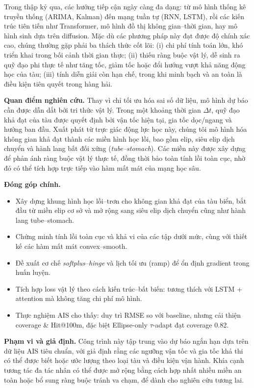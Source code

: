 \documentclass{IEEEtran}
\begin{document}
Trong thập kỷ qua, các hướng tiếp cận ngày càng đa dạng: từ mô hình thống kê truyền thống (ARIMA, Kalman) đến mạng tuần tự (RNN, LSTM), rồi các kiến trúc tiên tiến như Transformer, mô hình đồ thị không gian--thời gian, hay mô hình sinh dựa trên diffusion. 
Mặc dù các phương pháp này đạt được độ chính xác cao, chúng thường gặp phải ba thách thức cốt lõi: 
(i) chi phí tính toán lớn, khó triển khai trong bối cảnh thời gian thực; 
(ii) thiếu ràng buộc vật lý, dễ sinh ra quỹ đạo phi thực tế như tăng tốc, giảm tốc hoặc đổi hướng vượt khả năng động học của tàu; 
(iii) tính diễn giải còn hạn chế, trong khi minh bạch và an toàn là điều kiện tiên quyết trong hàng hải.

\textbf{Quan điểm nghiên cứu.} 
Thay vì chỉ tối ưu hóa sai số dữ liệu, mô hình dự báo cần được dẫn dắt bởi tri thức vật lý. 
Trong một khoảng thời gian $\Delta t$, quỹ đạo khả đạt của tàu được quyết định bởi vận tốc hiện tại, gia tốc dọc/ngang và hướng ban đầu. 
Xuất phát từ trực giác động lực học này, chúng tôi mô hình hóa không gian khả đạt thành các miền hình học lồi, bao gồm elip, siêu elip dịch chuyển và hành lang bất đối xứng (\textit{tube--stomach}). 
Các miền này được xây dựng để phản ánh ràng buộc vật lý thực tế, đồng thời bảo toàn tính lồi toàn cục, nhờ đó có thể tích hợp trực tiếp vào hàm mất mát của mạng học sâu.

\textbf{Đóng góp chính.}
\begin{itemize}
  \item Xây dựng khung hình học lồi--trơn cho không gian khả đạt của tàu biển, 
  bắt đầu từ miền elip cơ sở và mở rộng sang siêu elip dịch chuyển cũng như hành lang tube--stomach.
  \item Chứng minh tính lồi toàn cục và khả vi của các tập dưới mức, 
  cùng với thiết kế các hàm mất mát convex--smooth.
  \item Đề xuất cơ chế \emph{softplus--hinge} và lịch tối ưu (ramp) để ổn định gradient trong huấn luyện.
  \item Tích hợp loss vật lý theo cách kiến trúc--bất biến: 
  tương thích với LSTM + attention mà không tăng chi phí mô hình.
  \item Thực nghiệm AIS cho thấy: duy trì RMSE so với baseline, 
  nhưng cải thiện coverage \& Hit@100m, 
  đặc biệt Ellipse-only $\tau$-adapt đạt coverage 0.82.
\end{itemize}

\textbf{Phạm vi và giả định.} 
Công trình này tập trung vào dự báo ngắn hạn dựa trên dữ liệu AIS tiêu chuẩn, với giả định rằng các ngưỡng vận tốc và gia tốc khả thi có thể được biết hoặc ước lượng theo loại tàu và điều kiện vận hành. 
Khía cạnh tương tác đa tác nhân có thể được mở rộng bằng cách hợp nhất nhiều miền an toàn hoặc bổ sung ràng buộc tránh va chạm, để dành cho nghiên cứu tương lai.
\end{document}
